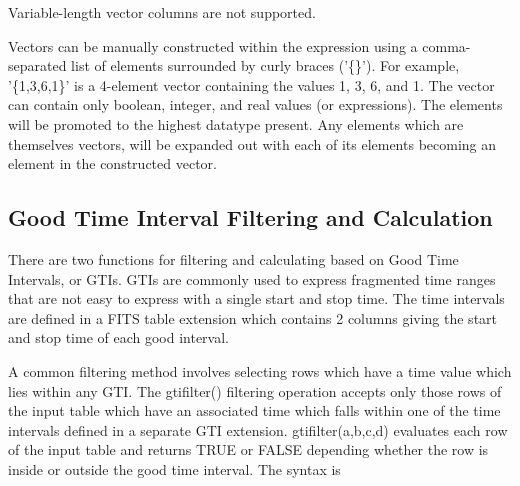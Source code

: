 \documentclass[11pt]{book}
\begin{document}
    Variable-length vector columns are not supported.

    Vectors can  be manually constructed  within the expression  using a
    comma-separated list of  elements surrounded by curly braces ('\{\}').
    For example, '\{1,3,6,1\}' is a 4-element vector containing the values
    1, 3, 6, and 1.  The  vector can contain  only boolean, integer, and
    real values (or expressions).  The elements will  be promoted to the
    highest  datatype   present.  Any   elements   which  are themselves
    vectors, will be expanded out with  each of its elements becoming an
    element in the constructed vector.


\subsection{Good Time Interval Filtering and Calculation}

    There are two functions for filtering and calculating based
    on Good Time Intervals, or GTIs.  GTIs are commonly used to
    express fragmented time ranges that are not easy to express with a
    single start and stop time.  The time intervals are defined in a
    FITS table extension which contains 2 columns giving the
    start and stop time of each good interval.

    A common filtering method involves selecting rows which have a
    time value which lies within any GTI.  The gtifilter() filtering
    operation accepts only those rows of the input table which have an
    associated time which falls within one of the time intervals
    defined in a separate GTI extension.  gtifilter(a,b,c,d) evaluates
    each row of the input table and returns TRUE or FALSE depending
    whether the row is inside or outside the good time interval.  The
    syntax is
\end{document}
